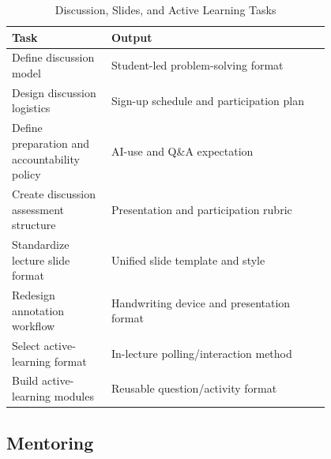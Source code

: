 \documentclass[custom, sidenote, final]{cls/oneproposal}
\begin{document}
\begin{table}[htbp]
    \centering
    \footnotesize
    \caption{Discussion, Slides, and Active Learning Tasks}\label{tab:ece2001-disc-slides-tasks}
    \begin{tabular}{m{0.25\linewidth} p{0.55\linewidth}}
        \toprule
        \textbf{Task}                                & \textbf{Output}                            \\
        \midrule
        Define discussion model                      & Student-led problem-solving format         \\
        \midrule
        Design discussion logistics                  & Sign-up schedule and participation plan    \\
        \midrule
        Define preparation and accountability policy & AI-use and Q\&A expectation                \\
        \midrule
        Create discussion assessment structure       & Presentation and participation rubric      \\
        \midrule
        Standardize lecture slide format             & Unified slide template and style           \\
        \midrule
        Redesign annotation workflow                 & Handwriting device and presentation format \\
        \midrule
        Select active-learning format                & In-lecture polling/interaction method      \\
        \midrule
        Build active-learning modules                & Reusable question/activity format          \\
        \bottomrule
    \end{tabular}
\end{table}

\subsection{Mentoring}
\end{document}
